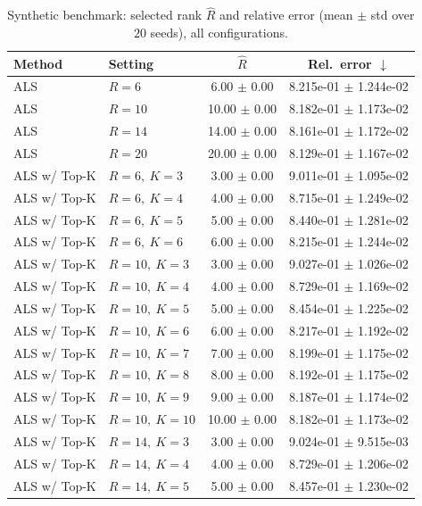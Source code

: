 \begin{table}[t]
\centering
\caption{Synthetic benchmark: selected rank \(\hat R\) and relative error (mean \(\pm\) std over \(20\) seeds), all configurations.}
\label{tab:results_synth_all}
\begin{tabular}{@{}llcc@{}}
\toprule
Method & Setting & \(\hat R\) & Rel.\ error \(\downarrow\) \\ \midrule
ALS & \(R=6\) & 6.00 $\pm$ 0.00 & 8.215e-01 $\pm$ 1.244e-02 \\
ALS & \(R=10\) & 10.00 $\pm$ 0.00 & 8.182e-01 $\pm$ 1.173e-02 \\
ALS & \(R=14\) & 14.00 $\pm$ 0.00 & 8.161e-01 $\pm$ 1.172e-02 \\
ALS & \(R=20\) & 20.00 $\pm$ 0.00 & 8.129e-01 $\pm$ 1.167e-02 \\
ALS w/ Top-K & \(R=6,\ K=3\) & 3.00 $\pm$ 0.00 & 9.011e-01 $\pm$ 1.095e-02 \\
ALS w/ Top-K & \(R=6,\ K=4\) & 4.00 $\pm$ 0.00 & 8.715e-01 $\pm$ 1.249e-02 \\
ALS w/ Top-K & \(R=6,\ K=5\) & 5.00 $\pm$ 0.00 & 8.440e-01 $\pm$ 1.281e-02 \\
ALS w/ Top-K & \(R=6,\ K=6\) & 6.00 $\pm$ 0.00 & 8.215e-01 $\pm$ 1.244e-02 \\
ALS w/ Top-K & \(R=10,\ K=3\) & 3.00 $\pm$ 0.00 & 9.027e-01 $\pm$ 1.026e-02 \\
ALS w/ Top-K & \(R=10,\ K=4\) & 4.00 $\pm$ 0.00 & 8.729e-01 $\pm$ 1.169e-02 \\
ALS w/ Top-K & \(R=10,\ K=5\) & 5.00 $\pm$ 0.00 & 8.454e-01 $\pm$ 1.225e-02 \\
ALS w/ Top-K & \(R=10,\ K=6\) & 6.00 $\pm$ 0.00 & 8.217e-01 $\pm$ 1.192e-02 \\
ALS w/ Top-K & \(R=10,\ K=7\) & 7.00 $\pm$ 0.00 & 8.199e-01 $\pm$ 1.175e-02 \\
ALS w/ Top-K & \(R=10,\ K=8\) & 8.00 $\pm$ 0.00 & 8.192e-01 $\pm$ 1.175e-02 \\
ALS w/ Top-K & \(R=10,\ K=9\) & 9.00 $\pm$ 0.00 & 8.187e-01 $\pm$ 1.174e-02 \\
ALS w/ Top-K & \(R=10,\ K=10\) & 10.00 $\pm$ 0.00 & 8.182e-01 $\pm$ 1.173e-02 \\
ALS w/ Top-K & \(R=14,\ K=3\) & 3.00 $\pm$ 0.00 & 9.024e-01 $\pm$ 9.515e-03 \\
ALS w/ Top-K & \(R=14,\ K=4\) & 4.00 $\pm$ 0.00 & 8.729e-01 $\pm$ 1.206e-02 \\
ALS w/ Top-K & \(R=14,\ K=5\) & 5.00 $\pm$ 0.00 & 8.457e-01 $\pm$ 1.230e-02 \\

\end{tabular}
\end{table}
